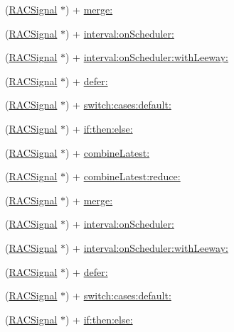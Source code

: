 \begin{DoxyCompactItemize}
(\mbox{\hyperlink{interface_r_a_c_signal}{R\+A\+C\+Signal}} $\ast$) + \mbox{\hyperlink{category_r_a_c_signal_07_operations_08_a37d7e9c259ad5253a1f3ff644a86e52b}{merge\+:}}
\item 
(\mbox{\hyperlink{interface_r_a_c_signal}{R\+A\+C\+Signal}} $\ast$) + \mbox{\hyperlink{category_r_a_c_signal_07_operations_08_a65442f423ebf08b9217f7bb206780a45}{interval\+:on\+Scheduler\+:}}
\item 
(\mbox{\hyperlink{interface_r_a_c_signal}{R\+A\+C\+Signal}} $\ast$) + \mbox{\hyperlink{category_r_a_c_signal_07_operations_08_acd968c129ec1afe3b5bc77db5fc13291}{interval\+:on\+Scheduler\+:with\+Leeway\+:}}
\item 
(\mbox{\hyperlink{interface_r_a_c_signal}{R\+A\+C\+Signal}} $\ast$) + \mbox{\hyperlink{category_r_a_c_signal_07_operations_08_a3f29638c9c7f60928b7a6cbf2fe25d6f}{defer\+:}}
\item 
(\mbox{\hyperlink{interface_r_a_c_signal}{R\+A\+C\+Signal}} $\ast$) + \mbox{\hyperlink{category_r_a_c_signal_07_operations_08_aac7816b22cfdcbe65cd43d99836ba1f5}{switch\+:cases\+:default\+:}}
\item 
(\mbox{\hyperlink{interface_r_a_c_signal}{R\+A\+C\+Signal}} $\ast$) + \mbox{\hyperlink{category_r_a_c_signal_07_operations_08_a67c14dfcf505999bc53632e336f6cb84}{if\+:then\+:else\+:}}
\item 
(\mbox{\hyperlink{interface_r_a_c_signal}{R\+A\+C\+Signal}} $\ast$) + \mbox{\hyperlink{category_r_a_c_signal_07_operations_08_a8a7a563a48665fb1203e2b37db6e5e98}{combine\+Latest\+:}}
\item 
(\mbox{\hyperlink{interface_r_a_c_signal}{R\+A\+C\+Signal}} $\ast$) + \mbox{\hyperlink{category_r_a_c_signal_07_operations_08_a5e4d2db914a14c415646d9fdda131221}{combine\+Latest\+:reduce\+:}}
\item 
(\mbox{\hyperlink{interface_r_a_c_signal}{R\+A\+C\+Signal}} $\ast$) + \mbox{\hyperlink{category_r_a_c_signal_07_operations_08_a37d7e9c259ad5253a1f3ff644a86e52b}{merge\+:}}
\item 
(\mbox{\hyperlink{interface_r_a_c_signal}{R\+A\+C\+Signal}} $\ast$) + \mbox{\hyperlink{category_r_a_c_signal_07_operations_08_a65442f423ebf08b9217f7bb206780a45}{interval\+:on\+Scheduler\+:}}
\item 
(\mbox{\hyperlink{interface_r_a_c_signal}{R\+A\+C\+Signal}} $\ast$) + \mbox{\hyperlink{category_r_a_c_signal_07_operations_08_acd968c129ec1afe3b5bc77db5fc13291}{interval\+:on\+Scheduler\+:with\+Leeway\+:}}
\item 
(\mbox{\hyperlink{interface_r_a_c_signal}{R\+A\+C\+Signal}} $\ast$) + \mbox{\hyperlink{category_r_a_c_signal_07_operations_08_a3f29638c9c7f60928b7a6cbf2fe25d6f}{defer\+:}}
\item 
(\mbox{\hyperlink{interface_r_a_c_signal}{R\+A\+C\+Signal}} $\ast$) + \mbox{\hyperlink{category_r_a_c_signal_07_operations_08_aac7816b22cfdcbe65cd43d99836ba1f5}{switch\+:cases\+:default\+:}}
\item 
(\mbox{\hyperlink{interface_r_a_c_signal}{R\+A\+C\+Signal}} $\ast$) + \mbox{\hyperlink{category_r_a_c_signal_07_operations_08_a67c14dfcf505999bc53632e336f6cb84}{if\+:then\+:else\+:}}
\end{DoxyCompactItemize}
